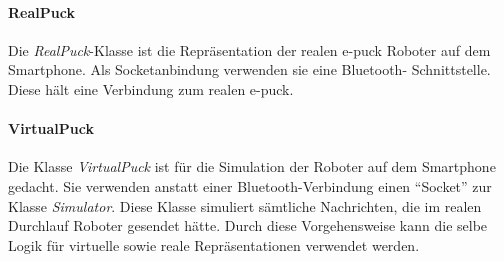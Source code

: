 \documentclass[10pt,a4paper]{article}
\begin{document}
      		\paragraph*{RealPuck}      	
			Die \textit{RealPuck}-Klasse ist die Repräsentation der realen e-puck Roboter auf dem Smartphone. Als Socketanbindung verwenden sie eine Bluetooth-
			Schnittstelle. Diese hält eine Verbindung zum realen e-puck.
			\paragraph*{VirtualPuck}
			Die Klasse \textit{VirtualPuck} ist für die Simulation der Roboter auf dem Smartphone gedacht. Sie verwenden anstatt einer Bluetooth-Verbindung einen
			``Socket'' zur Klasse \textit{Simulator}. Diese Klasse simuliert sämtliche Nachrichten, die im realen Durchlauf Roboter gesendet hätte. Durch diese
			Vorgehensweise kann die selbe Logik für virtuelle sowie reale Repräsentationen verwendet werden.
\end{document}
